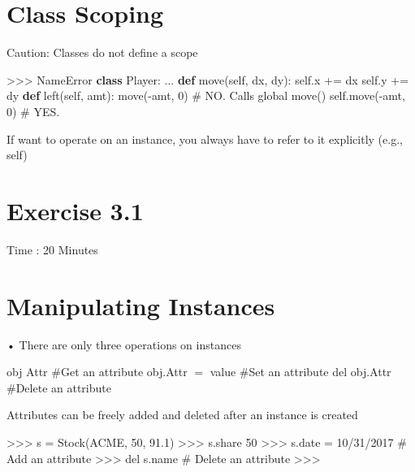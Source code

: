 \documentclass[
  letterpaper,
  DIV=11,
  numbers=noendperiod]{scrreprt}
\newenvironment{Shaded}{\begin{snugshade}}{\end{snugshade}}
\newcommand{\CommentTok}[1]{\textcolor[rgb]{0.37,0.37,0.37}{#1}}
\newcommand{\DecValTok}[1]{\textcolor[rgb]{0.68,0.00,0.00}{#1}}
\newcommand{\KeywordTok}[1]{\textcolor[rgb]{0.00,0.23,0.31}{\textbf{#1}}}
\newcommand{\NormalTok}[1]{\textcolor[rgb]{0.00,0.23,0.31}{#1}}
\newcommand{\OperatorTok}[1]{\textcolor[rgb]{0.37,0.37,0.37}{#1}}
\newcommand{\PreprocessorTok}[1]{\textcolor[rgb]{0.68,0.00,0.00}{#1}}
\newcommand{\VariableTok}[1]{\textcolor[rgb]{0.07,0.07,0.07}{#1}}
\begin{document}

\chapter{Class Scoping}\label{class-scoping}

Caution: Classes do not define a scope

\begin{Shaded}
\begin{Highlighting}[]
\OperatorTok{\textgreater{}\textgreater{}\textgreater{}} \PreprocessorTok{NameError}
\KeywordTok{class}\NormalTok{ Player:}
\NormalTok{    ...}
    \KeywordTok{def}\NormalTok{ move(}\VariableTok{self}\NormalTok{, dx, dy):}
        \VariableTok{self}\NormalTok{.x }\OperatorTok{+=}\NormalTok{ dx}
        \VariableTok{self}\NormalTok{.y }\OperatorTok{+=}\NormalTok{ dy}
    \KeywordTok{def}\NormalTok{ left(}\VariableTok{self}\NormalTok{, amt):}
\NormalTok{        move(}\OperatorTok{{-}}\NormalTok{amt, }\DecValTok{0}\NormalTok{)  }\CommentTok{\# NO. Calls global move()}
        \VariableTok{self}\NormalTok{.move(}\OperatorTok{{-}}\NormalTok{amt, }\DecValTok{0}\NormalTok{)  }\CommentTok{\# YES. }
\end{Highlighting}
\end{Shaded}

If want to operate on an instance, you always have to refer to it
explicitly (e.g., self)


\chapter{Exercise 3.1}\label{exercise-3.1}

Time : 20 Minutes


\chapter{Manipulating Instances}\label{manipulating-instances}

• There are only three operations on instances

obj Attr \#Get an attribute obj.Attr \(=\) value \#Set an attribute del
obj.Attr \#Delete an attribute

Attributes can be freely added and deleted after an instance is created

\begin{Shaded}
\begin{Highlighting}[]
\NormalTok{\textgreater{}\textgreater{}\textgreater{} s = Stock(\textquotesingle{}ACME\textquotesingle{}, 50, 91.1)  }
\NormalTok{\textgreater{}\textgreater{}\textgreater{} s.share  }
\NormalTok{50  }
\NormalTok{\textgreater{}\textgreater{}\textgreater{} s.date = \textquotesingle{}10/31/2017\textquotesingle{} \# Add an attribute  }
\NormalTok{\textgreater{}\textgreater{}\textgreater{} del s.name \# Delete an attribute  }
\NormalTok{\textgreater{}\textgreater{}\textgreater{} }
\end{Highlighting}
\end{Shaded}
\end{document}
